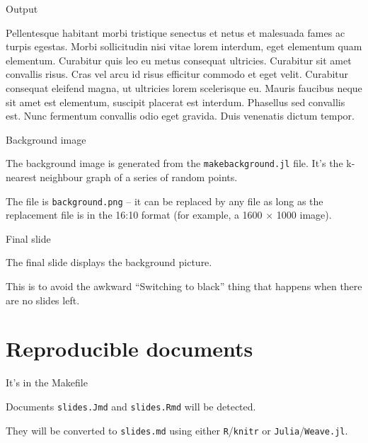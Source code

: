 \documentclass[11pt, compress, aspectratio=1610]{beamer}
\let\OldTexttt\texttt
\renewcommand{\texttt}[1]{\OldTexttt{\color{plTT}#1}}
\begin{document}
\begin{frame}{%
\protect\hypertarget{output}{%
Output}}

Pellentesque habitant morbi tristique senectus et netus et malesuada
fames ac turpis egestas. Morbi sollicitudin nisi vitae lorem interdum,
eget elementum quam elementum. Curabitur quis leo eu metus consequat
ultricies. Curabitur sit amet convallis risus. Cras vel arcu id risus
efficitur commodo et eget velit. Curabitur consequat eleifend magna, ut
ultricies lorem scelerisque eu. Mauris faucibus neque sit amet est
elementum, suscipit placerat est interdum. Phasellus sed convallis est.
Nunc fermentum convallis odio eget gravida. Duis venenatis dictum
tempor.

\end{frame}

\begin{frame}[fragile]{%
\protect\hypertarget{background-image}{%
Background image}}

The background image is generated from the \texttt{makebackground.jl}
file. It’s the k-nearest neighbour graph of a series of random points.

The file is \texttt{background.png} – it can be replaced by any file
\alert{as long
as} the replacement file is in the 16:10 format (for example, a 1600
\(\times\) 1000 image).

\end{frame}

\begin{frame}{%
\protect\hypertarget{final-slide}{%
Final slide}}

The final slide displays the background picture.

This is to avoid the awkward “Switching to black” thing that happens
when there are no slides left.

\end{frame}

\hypertarget{reproducible-documents}{%
\section{Reproducible documents}\label{reproducible-documents}}

\begin{frame}[fragile]{%
\protect\hypertarget{its-in-the-makefile}{%
It’s in the Makefile}}

Documents \texttt{slides.Jmd} and \texttt{slides.Rmd} will be detected.

They will be converted to \texttt{slides.md} using either
\texttt{R}/\texttt{knitr} or \texttt{Julia}/\texttt{Weave.jl}.

\end{frame}
\end{document}
